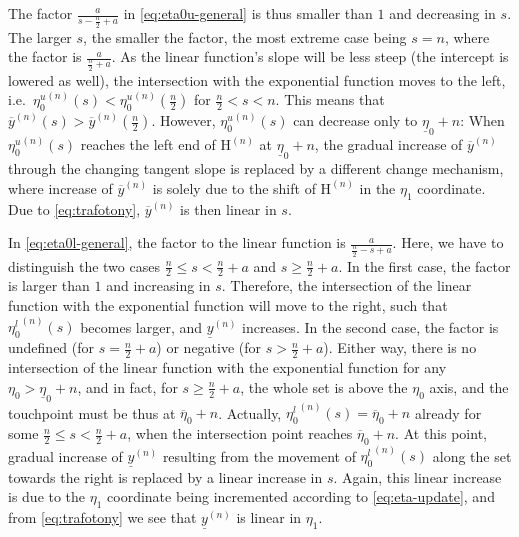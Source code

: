 \documentclass[runningheads,a4paper]{llncs}
\newcommand{\un}{^{(n)}} %
\newcommand{\ul}[1]{\underline{#1}}
\newcommand{\ol}[1]{\overline{#1}}
\def\ynl{\ul{y}\un}
\def\ynu{\ol{y}\un}
\def\EN{\mathrm{H}\un}
\def\ezl{\ul{\eta}_0}
\def\ezu{\ol{\eta}_0}
\begin{document}

The factor $\frac{a}{s - \frac{n}{2} + a}$
in \eqref{eq:eta0u-general} is thus smaller than $1$ and decreasing in $s$.
The larger $s$, the smaller the factor, the most extreme case being $s=n$,
where the factor is $\frac{a}{\frac{n}{2} + a}$.
As the linear function's slope will be less steep (the intercept is lowered as well),
the intersection with the exponential function moves to the left,
i.e.\ ${\eta_0^u}\un(s) < {\eta_0^u}\un(\frac{n}{2})$ for $\frac{n}{2} < s < n$.
This means that $\ynu(s) > \ynu(\frac{n}{2})$.
However, ${\eta_0^u}\un(s)$ can decrease only to $\ezl+n$:
When ${\eta_0^u}\un(s)$ reaches the left end of $\EN$ at $\ezl+n$,
the gradual increase of $\ynu$ through the changing tangent slope 
is replaced by a different change mechanism,
where increase of $\ynu$ is solely due to the shift of $\EN$ in the $\eta_1$ coordinate.
Due to \eqref{eq:trafotony}, $\ynu$ is then linear in $s$.


In \eqref{eq:eta0l-general}, the factor to the linear function is $\frac{a}{\frac{n}{2} - s + a}$.
Here, we have to distinguish the two cases $\frac{n}{2} \le s < \frac{n}{2} + a$
and $s \ge \frac{n}{2} + a$.
In the first case, the factor is larger than $1$ and increasing in $s$.
Therefore, the intersection of the linear function with the exponential function
will move to the right, such that ${\eta_0^l}\un(s)$ becomes larger, and $\ynl$ increases.
In the second case, the factor is undefined (for $s = \frac{n}{2} + a$)
or negative (for $s > \frac{n}{2} + a$).
Either way, there is no intersection of the linear function with the exponential function
for any $\eta_0 > \ezl + n$, and %
in fact, for $s \ge \frac{n}{2} + a$, the whole set is above the $\eta_0$ axis,
and the touchpoint must be thus at $\ezu + n$.
Actually, ${\eta_0^l}\un(s) = \ezu + n$ already for some $\frac{n}{2} \le s < \frac{n}{2} + a$,
when the intersection point reaches $\ezu + n$.
At this point, gradual increase of $\ynl$ resulting from the movement of ${\eta_0^l}\un(s)$ along the set
towards the right is replaced by a linear increase in $s$.
Again, this linear increase is due to the $\eta_1$ coordinate being incremented
according to \eqref{eq:eta-update},
and from \eqref{eq:trafotony} we see that $\ynl$ is linear in $\eta_1$.
\end{document}

